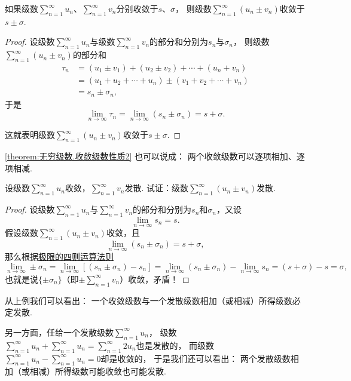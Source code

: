 \begin{property}\label{theorem:无穷级数.收敛级数性质2}
如果级数\(\sum\limits_{n=1}^\infty u_n\)、\(\sum\limits_{n=1}^\infty v_n\)分别收敛于\(s\)、\(\sigma\)，
则级数\(\sum\limits_{n=1}^\infty(u_n \pm v_n)\)收敛于\(s \pm \sigma\).
\begin{proof}
设级数\(\sum\limits_{n=1}^\infty u_n\)与级数\(\sum\limits_{n=1}^\infty v_n\)的部分和分别为\(s_n\)与\(\sigma_n\)，
则级数\(\sum\limits_{n=1}^\infty(u_n \pm v_n)\)的部分和\begin{align*}
	\tau_n &= (u_1 \pm v_1) + (u_2 \pm v_2) + \dotsb + (u_n + v_n) \\
	&= (u_1 + u_2 + \dotsb + u_n) \pm (v_1 + v_2 + \dotsb + v_n) \\
	&= s_n \pm \sigma_n,
\end{align*}
于是\[
	\lim\limits_{n\to\infty} \tau_n
	= \lim\limits_{n\to\infty} (s_n \pm \sigma_n)
	= s + \sigma.
\]

这就表明级数\(\sum\limits_{n=1}^\infty(u_n \pm v_n)\)收敛于\(s \pm \sigma\).
\end{proof}
\end{property}
\cref{theorem:无穷级数.收敛级数性质2} 也可以说成：
{\color{red}两个收敛级数可以逐项相加、逐项相减.}

\begin{example}
设级数\(\sum\limits_{n=1}^\infty u_n\)收敛，\(\sum\limits_{n=1}^\infty v_n\)发散.
试证：级数\(\sum\limits_{n=1}^\infty (u_n \pm v_n)\)发散.
\begin{proof}
设级数\(\sum\limits_{n=1}^\infty u_n\)与\(\sum\limits_{n=1}^\infty v_n\)的部分和分别为\(s_n\)和\(\sigma_n\)，又设\[
\lim\limits_{n\to\infty} s_n = s.
\]
假设级数\(\sum\limits_{n=1}^\infty (u_n \pm v_n)\)收敛，且\[
\lim\limits_{n\to\infty} (s_n \pm \sigma_n) = s+\sigma,
\]那么根据\hyperref[theorem:极限.极限的四则运算法则]{极限的四则运算法则}\[
\lim\limits_{n\to\infty} \pm\sigma_n
= \lim\limits_{n\to\infty} [(s_n \pm \sigma_n) - s_n]
= \lim\limits_{n\to\infty} (s_n \pm \sigma_n) - \lim\limits_{n\to\infty} s_n
= (s + \sigma) - s
= \sigma,
\]也就是说\(\{\pm\sigma_n\}\)（即\(\pm\sum\limits_{n=1}^\infty v_n\)）收敛，矛盾！
\end{proof}
\end{example}
从上例我们可以看出：
{\color{red}一个收敛级数与一个发散级数相加（或相减）所得级数必定发散.}

另一方面，任给一个发散级数\(\sum\limits_{n=1}^\infty u_n\)，
级数\(\sum\limits_{n=1}^\infty u_n + \sum\limits_{n=1}^\infty u_n
= \sum\limits_{n=1}^\infty 2 u_n\)也是发散的，
而级数\(\sum\limits_{n=1}^\infty u_n - \sum\limits_{n=1}^\infty u_n
= 0\)却是收敛的，
于是我们还可以看出：
{\color{red}两个发散级数相加（或相减）所得级数可能收敛也可能发散.}

